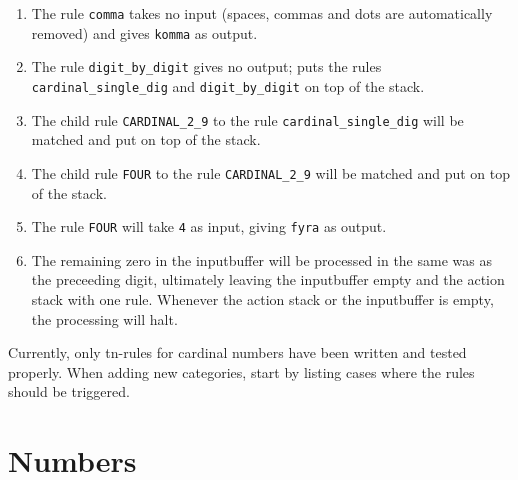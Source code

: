 \documentclass[10pt,a4paper]{article}
\begin{document}
\begin{enumerate}
\item The rule \verb!comma! takes no input (spaces, commas and dots are automatically removed) and gives \verb!komma! as output.
\item The rule \verb!digit_by_digit! gives no output; puts the rules \verb!cardinal_single_dig! and \verb!digit_by_digit! on top of the stack.
\item The child rule \verb!CARDINAL_2_9! to the rule \verb!cardinal_single_dig! will be matched and put on top of the stack.
\item The child rule \verb!FOUR! to the rule \verb!CARDINAL_2_9! will be matched and put on top of the stack.
\item The rule \verb!FOUR! will take \verb!4! as input, giving \verb!fyra! as output.
\item The remaining zero in the inputbuffer will be processed in the same was as the preceeding digit, ultimately leaving the inputbuffer empty and the action stack with one rule. Whenever the action stack or the inputbuffer is empty, the processing will halt.
\end{enumerate}

Currently, only tn-rules for cardinal numbers have been written and tested properly. When adding new categories, start by listing cases where the rules should be triggered.

\section{Numbers}
\end{document}

